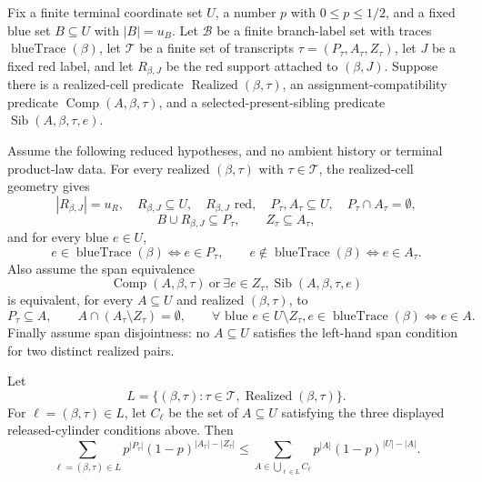 \begin{helper}
Fix a finite terminal coordinate set \(U\), a number \(p\) with
\(0\le p\le 1/2\), and a fixed blue set \(B\subseteq U\) with
\(|B|=u_B\).  Let \(\mathcal B\) be a finite branch-label set with traces
\(\operatorname{blueTrace}(\beta)\), let \(\mathcal T\) be a finite set of
transcripts \(\tau=(P_\tau,A_\tau,Z_\tau)\), let \(J\) be a fixed red label,
and let \(R_{\beta,J}\) be the red support attached to \((\beta,J)\).  Suppose
there is a realized-cell predicate \(\operatorname{Realized}(\beta,\tau)\),
an assignment-compatibility predicate \(\operatorname{Comp}(A,\beta,\tau)\),
and a selected-present-sibling predicate
\(\operatorname{Sib}(A,\beta,\tau,e)\).

Assume the following reduced hypotheses, and no ambient history or terminal
product-law data.  For every realized \((\beta,\tau)\) with
\(\tau\in\mathcal T\), the realized-cell geometry gives
\[
|R_{\beta,J}|=u_R,\quad R_{\beta,J}\subseteq U,\quad
R_{\beta,J}\text{ red},\quad
P_\tau,A_\tau\subseteq U,\quad P_\tau\cap A_\tau=\emptyset,
\]
\[
B\cup R_{\beta,J}\subseteq P_\tau,\qquad Z_\tau\subseteq A_\tau,
\]
and for every blue \(e\in U\),
\[
e\in\operatorname{blueTrace}(\beta)\Longleftrightarrow e\in P_\tau,
\qquad
e\notin\operatorname{blueTrace}(\beta)\Longleftrightarrow e\in A_\tau .
\]
Also assume the span equivalence
\[
\operatorname{Comp}(A,\beta,\tau)\ \text{or}\
\exists e\in Z_\tau,\operatorname{Sib}(A,\beta,\tau,e)
\]
is equivalent, for every \(A\subseteq U\) and realized \((\beta,\tau)\), to
\[
P_\tau\subseteq A,\qquad
A\cap(A_\tau\setminus Z_\tau)=\emptyset,\qquad
\forall\text{ blue }e\in U\setminus Z_\tau,
  e\in\operatorname{blueTrace}(\beta)\Longleftrightarrow e\in A .
\]
Finally assume span disjointness: no \(A\subseteq U\) satisfies the left-hand
span condition for two distinct realized pairs.

Let
\[
L=\{(\beta,\tau):\tau\in\mathcal T,
      \operatorname{Realized}(\beta,\tau)\}.
\]
For \(\ell=(\beta,\tau)\in L\), let \(C_\ell\) be the set of
\(A\subseteq U\) satisfying the three displayed released-cylinder conditions
above.  Then
\[
\sum_{\ell=(\beta,\tau)\in L}
  p^{|P_\tau|}(1-p)^{|A_\tau|-|Z_\tau|}
\le
\sum_{A\in \bigcup_{\ell\in L} C_\ell}
  p^{|A|}(1-p)^{|U|-|A|}.
\]
\end{helper}

